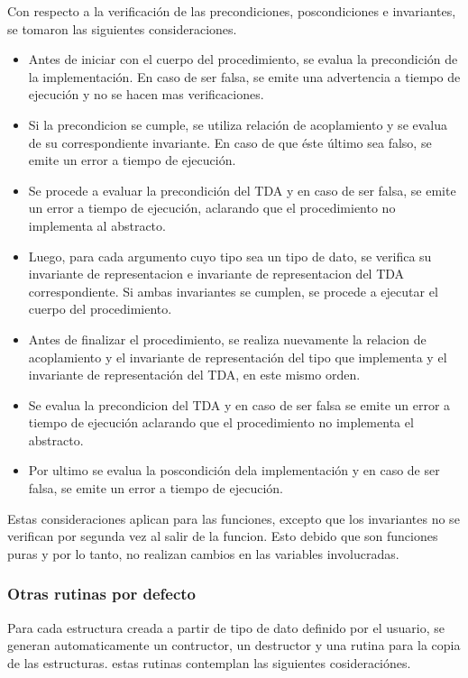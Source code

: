 Con respecto a la verificación de las precondiciones, poscondiciones e
invariantes, se tomaron las siguientes consideraciones.

\begin{itemize}

  \item Antes de iniciar con el cuerpo del procedimiento, se
  evalua la precondición de la implementación. En caso de ser falsa, se 
  emite una advertencia a tiempo de ejecución y no se hacen mas verificaciones.

  \item Si la precondicion se cumple, se utiliza relación de acoplamiento y se
  evalua de su correspondiente invariante. En caso de que éste último sea
  falso, se emite un error a tiempo de ejecución.

  \item Se procede a evaluar la precondición del TDA y en caso de ser falsa, 
  se emite un error a tiempo de ejecución, aclarando que el procedimiento no
  implementa al abstracto.

  \item Luego, para cada argumento cuyo tipo sea un tipo de dato, se verifica
  su invariante de representacion e invariante de representacion del TDA
  correspondiente. Si ambas invariantes se cumplen, se procede a ejecutar el
  cuerpo del procedimiento.

  \item Antes de finalizar el procedimiento, se realiza nuevamente la relacion
  de acoplamiento y el invariante de representación del tipo que implementa y
  el invariante de representación del TDA, en este mismo orden.

  \item Se evalua la precondicion del TDA y en caso de ser falsa se emite un
  error a tiempo de ejecución aclarando que el procedimiento no implementa el
  abstracto.

  \item Por ultimo se evalua la poscondición dela implementación y en caso de
  ser falsa, se emite un error a tiempo de ejecución.

\end{itemize}

Estas consideraciones aplican para las funciones, excepto que los invariantes
no se verifican por segunda vez al salir de la funcion. Esto debido que son
funciones puras y por lo tanto, no realizan cambios en las variables
involucradas.

\subsubsection{Otras rutinas por defecto}
Para cada estructura creada a partir de tipo de dato definido por el usuario,
se generan automaticamente un contructor, un destructor y una rutina para la
copia de las estructuras. estas rutinas contemplan las siguientes
cosideraciónes.

